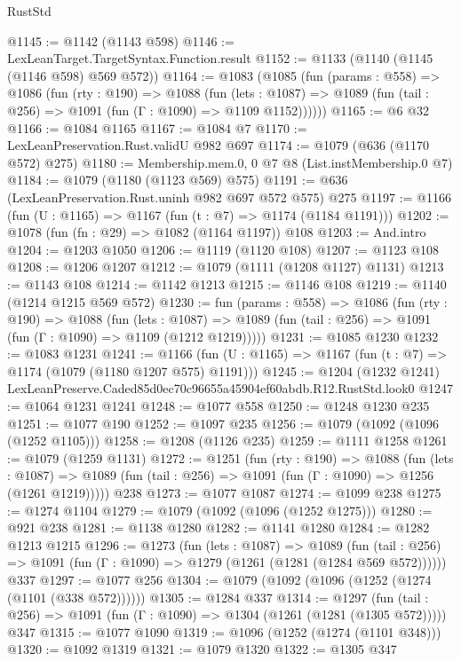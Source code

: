 \begin{lexlean}{RustStd}
\begin{coremodule}
@1145 := @1142 (@1143 @598)
@1146 := LexLeanTarget.TargetSyntax.Function.result
@1152 := @1133 (@1140 (@1145 (@1146 @598) @569 @572))
@1164 := @1083
    (@1085
      (fun (params : @558) =>
      @1086
        (fun (rty : @190) =>
        @1088
          (fun (lets : @1087) =>
          @1089 (fun (tail : @256) => @1091 (fun (Γ : @1090) => @1109 @1152))))))
@1165 := @6 @32
@1166 := @1084 @1165
@1167 := @1084 @7
@1170 := LexLeanPreservation.Rust.validU @982 @697
@1174 := @1079 (@636 (@1170 @572) @275)
@1180 := Membership.mem.{0, 0} @7 @8 (List.instMembership.{0} @7)
@1184 := @1079 (@1180 (@1123 @569) @575)
@1191 := @636 (LexLeanPreservation.Rust.uninh @982 @697 @572 @575) @275
@1197 := @1166 (fun (U : @1165) => @1167 (fun (t : @7) => @1174 (@1184 @1191)))
@1202 := @1078 (fun (fn : @29) => @1082 (@1164 @1197)) @108
@1203 := And.intro
@1204 := @1203 @1050
@1206 := @1119 (@1120 @108)
@1207 := @1123 @108
@1208 := @1206 @1207
@1212 := @1079 (@1111 (@1208 @1127) @1131)
@1213 := @1143 @108
@1214 := @1142 @1213
@1215 := @1146 @108
@1219 := @1140 (@1214 @1215 @569 @572)
@1230 := fun (params : @558) =>
  @1086
    (fun (rty : @190) =>
    @1088
      (fun (lets : @1087) =>
      @1089 (fun (tail : @256) => @1091 (fun (Γ : @1090) => @1109 (@1212 @1219)))))
@1231 := @1085 @1230
@1232 := @1083 @1231
@1241 := @1166 (fun (U : @1165) => @1167 (fun (t : @7) => @1174 (@1079 (@1180 @1207 @575) @1191)))
@1245 := @1204 (@1232 @1241) LexLeanPreserve.Caded85d0ec70c96655a45904ef60abdb.R12.RustStd.look0
@1247 := @1064 @1231 @1241
@1248 := @1077 @558
@1250 := @1248 @1230 @235
@1251 := @1077 @190
@1252 := @1097 @235
@1256 := @1079 (@1092 (@1096 (@1252 @1105)))
@1258 := @1208 (@1126 @235)
@1259 := @1111 @1258
@1261 := @1079 (@1259 @1131)
@1272 := @1251
    (fun (rty : @190) =>
    @1088
      (fun (lets : @1087) =>
      @1089 (fun (tail : @256) => @1091 (fun (Γ : @1090) => @1256 (@1261 @1219)))))
    @238
@1273 := @1077 @1087
@1274 := @1099 @238
@1275 := @1274 @1104
@1279 := @1079 (@1092 (@1096 (@1252 @1275)))
@1280 := @921 @238
@1281 := @1138 @1280
@1282 := @1141 @1280
@1284 := @1282 @1213 @1215
@1296 := @1273
    (fun (lets : @1087) =>
    @1089 (fun (tail : @256) => @1091 (fun (Γ : @1090) => @1279 (@1261 (@1281 (@1284 @569 @572))))))
    @337
@1297 := @1077 @256
@1304 := @1079 (@1092 (@1096 (@1252 (@1274 (@1101 (@338 @572))))))
@1305 := @1284 @337
@1314 := @1297
    (fun (tail : @256) => @1091 (fun (Γ : @1090) => @1304 (@1261 (@1281 (@1305 @572)))))
    @347
@1315 := @1077 @1090
@1319 := @1096 (@1252 (@1274 (@1101 @348)))
@1320 := @1092 @1319
@1321 := @1079 @1320
@1322 := @1305 @347

\end{coremodule}
\end{lexlean}
